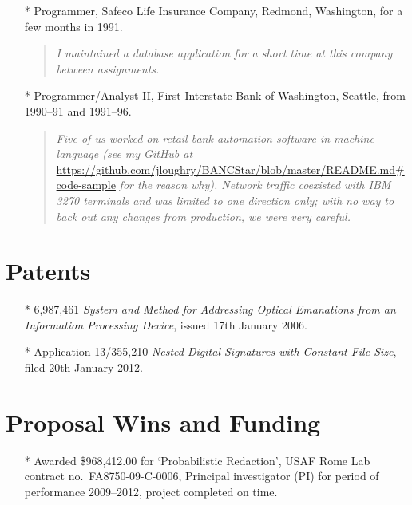 \documentclass[letterpaper]{article}
\begin{document}
\begin{itemize}
	\item[*] Programmer, Safeco Life Insurance Company, Redmond, Washington, for a few months
		in 1991.
		\begin{quote}\vspace{-2mm}
			\emph{I maintained a database application for a short time at this company
				between assignments.}
		\end{quote}

	\item[*] Programmer/Analyst II, First Interstate Bank of Washington, Seattle,
		from 1990--91 and 1991--96.
		\begin{quote}\vspace{-2mm}
			\emph{Five of us worked on retail bank automation software in machine language
			(see my GitHub at}
			\url{https://github.com/jloughry/BANCStar/blob/master/README.md#code-sample}
			\emph{for the reason why).  Network traffic coexisted with IBM 3270 terminals
			and was limited to one direction only; with no way to back out any changes from
			production, we were very careful.}
		\end{quote}
\end{itemize}

\vspace{-5mm}
\section*{Patents}

\begin{itemize}
    \item[*] 6,987,461 \emph{System and Method for Addressing Optical Emanations
		from an Information Processing Device}, issued 17th January 2006.

	\item[*] Application 13/355,210 \emph{Nested Digital Signatures with Constant File Size},
		filed 20th January 2012.
\end{itemize}

\section*{Proposal Wins and Funding}

\begin{itemize}
	\item[*] Awarded \$968,412.00 for `Probabilistic Redaction', USAF Rome Lab contract
	no.\ FA8750-09-C-0006, Principal investigator (PI) for period of performance
	2009--2012, project completed on time.
\end{itemize}
\end{document}
